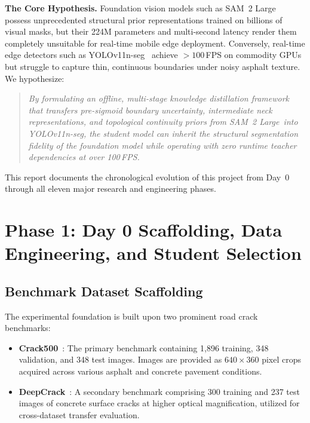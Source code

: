 \documentclass[11pt,a4paper]{article}
\newcommand{\yolo}{YOLOv11n-seg}
\newcommand{\sam}{SAM~2 Large}
\begin{document}
\noindent\textbf{The Core Hypothesis.}
Foundation vision models such as \sam~\cite{ravi2024sam2} possess unprecedented structural prior representations trained on billions of visual masks, but their 224M parameters and multi-second latency render them completely unsuitable for real-time mobile edge deployment. 
Conversely, real-time edge detectors such as \yolo~\cite{jocher2023ultralytics} achieve $>100$\,FPS on commodity GPUs but struggle to capture thin, continuous boundaries under noisy asphalt texture.
We hypothesize:
\begin{quote}
\emph{By formulating an offline, multi-stage knowledge distillation framework that transfers pre-sigmoid boundary uncertainty, intermediate neck representations, and topological continuity priors from \sam\ into \yolo, the student model can inherit the structural segmentation fidelity of the foundation model while operating with zero runtime teacher dependencies at over 100\,FPS.}
\end{quote}

This report documents the chronological evolution of this project from Day~0 through all eleven major research and engineering phases.

\section{Phase 1: Day 0 Scaffolding, Data Engineering, and Student Selection}
\label{sec:phase1}

\subsection{Benchmark Dataset Scaffolding}
The experimental foundation is built upon two prominent road crack benchmarks:
\begin{itemize}[leftmargin=1.5em]
  \item \textbf{Crack500}~\cite{zhang2016crack500}: The primary benchmark containing 1,896 training, 348 validation, and 348 test images. Images are provided as $640\times360$ pixel crops acquired across various asphalt and concrete pavement conditions.
  \item \textbf{DeepCrack}~\cite{liu2019deepcrack}: A secondary benchmark comprising 300 training and 237 test images of concrete surface cracks at higher optical magnification, utilized for cross-dataset transfer evaluation.
\end{itemize}
\end{document}

